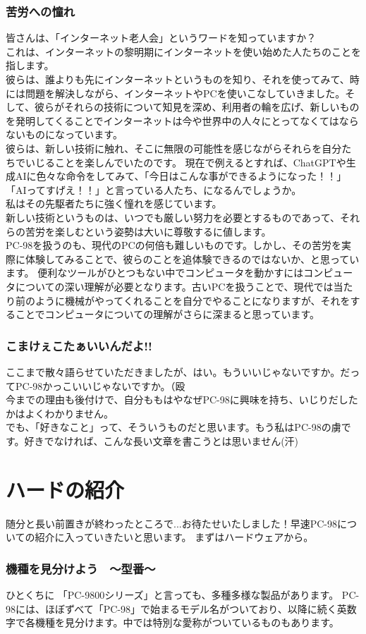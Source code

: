 \documentclass[b5paper,9pt,platex,dvipdfmx]{jsarticle}
\begin{document}
\begin{multicols}{3}
\section[short]{苦労への憧れ}
皆さんは、「インターネット老人会」というワードを知っていますか？\\
これは、インターネットの黎明期にインターネットを使い始めた人たちのことを指します。\\
彼らは、誰よりも先にインターネットというものを知り、それを使ってみて、時には問題を解決しながら、インターネットやPCを使いこなしていきました。そして、彼らがそれらの技術について知見を深め、利用者の輪を広げ、新しいものを発明してくることでインターネットは今や世界中の人々にとってなくてはならないものになっています。\\
彼らは、新しい技術に触れ、そこに無限の可能性を感じながらそれらを自分たちでいじることを楽しんでいたのです。
現在で例えるとすれば、ChatGPTや生成AIに色々な命令をしてみて、「今日はこんな事ができるようになった！！」「AIってすげえ！！」と言っている人たち、になるんでしょうか。\\
私はその先駆者たちに強く憧れを感じています。\\
新しい技術というものは、いつでも厳しい努力を必要とするものであって、それらの苦労を楽しむという姿勢は大いに尊敬するに値します。\\
PC-98を扱うのも、現代のPCの何倍も難しいものです。しかし、その苦労を実際に体験してみることで、彼らのことを追体験できるのではないか、と思っています。
便利なツールがひとつもない中でコンピュータを動かすにはコンピュータについての深い理解が必要となります。古いPCを扱うことで、現代では当たり前のように機械がやってくれることを自分でやることになりますが、それをすることでコンピュータについての理解がさらに深まると思っています。\\
\section[short]{こまけぇこたぁいいんだよ!!}
ここまで散々語らせていただきましたが、はい。もういいじゃないですか。だってPC-98かっこいいじゃないですか。（殴\\
今までの理由も後付けで、自分ももはやなぜPC-98に興味を持ち、いじりだしたかはよくわかりません。\\
でも、「好きなこと」って、そういうものだと思います。もう私はPC-98の虜です。好きでなければ、こんな長い文章を書こうとは思いません(汗)
\part{ハードの紹介}
\setcounter{section}{0}
随分と長い前置きが終わったところで...お待たせいたしました！早速PC-98についての紹介に入っていきたいと思います。
まずはハードウェアから。
\section[short]{機種を見分けよう　〜型番〜}
ひとくちに 「PC-9800シリーズ」と言っても、多種多様な製品があります。
PC-98には、ほぼずべて「PC-98」で始まるモデル名がついており、以降に続く英数字で各機種を見分けます。中では特別な愛称がついているものもあります。
\end{multicols}
\end{document}
